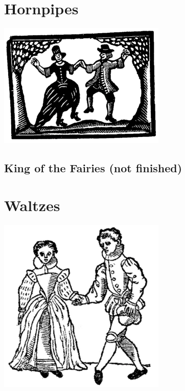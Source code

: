 \documentclass[12pt]{report}
\begin{document}
\chapter*{Hornpipes}
\begin{center}
\includegraphics[width=8cm]{../images/hornpipes}
\end{center}

\section*{King of the Fairies (not finished)}


\chapter*{Waltzes}
\begin{center}
\includegraphics[width=8cm]{../images/waltzes}
\end{center}

\end{document}

